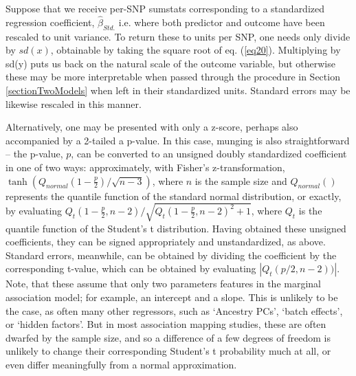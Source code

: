 \documentclass[12pt]{article}
\begin{document}
Suppose that we receive per-SNP sumstats corresponding to a standardized regression coefficient, $\hat{\beta}_{Std.}$ i.e. where both predictor and outcome have been rescaled to unit variance. To return these to units per SNP, one needs only divide by $sd(x)$, obtainable by taking the square root of eq. (\ref{eq20}). Multiplying by sd(y) puts us back on the natural scale of the outcome variable, but otherwise these may be more interpretable when passed through the procedure in Section \ref{sectionTwoModels} when left in their standardized units. Standard errors may be likewise rescaled in this manner.

Alternatively, one may be presented with only a z-score, perhaps also accompanied by a 2-tailed a p-value. In this case, munging is also straightforward -- the p-value, $p$, can be converted to an unsigned doubly standardized coefficient in one of two ways: approximately, with Fisher's z-transformation, $\tanh(Q_{normal}(1-\frac{p}{2})/\sqrt{n-3})$, where $n$ is the sample size and $Q_{normal}()$ represents the quantile function of the standard normal distribution, or exactly, by evaluating $Q_{t}(1-\frac{p}{2}, n - 2) / \sqrt{Q_{t}(1-\frac{p}{2}, n - 2)^2 + 1}$, where $Q_{t}$ is the quantile function of the Student's t distribution. Having obtained these unsigned coefficients, they can be signed appropriately and unstandardized, as above. Standard errors, meanwhile, can be obtained by dividing the coefficient by the corresponding t-value, which can be obtained by evaluating $|Q_{t}(p/2, n-2))|$. Note, that these assume that only two parameters features in the marginal association model; for example, an intercept and a slope. This is unlikely to be the case, as often many other regressors, such as `Ancestry PCs', `batch effects', or `hidden factors'. But in most association mapping studies, these are often dwarfed by the sample size, and so a difference of a few degrees of freedom is unlikely to change their corresponding Student's t probability much at all, or even differ meaningfully from a normal approximation.
\end{document}
